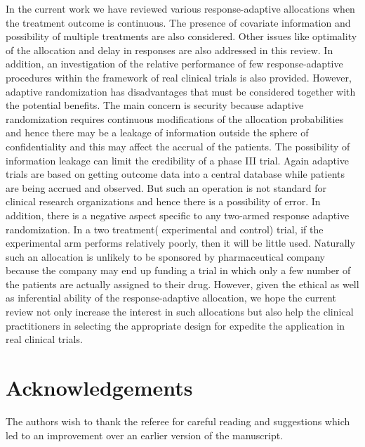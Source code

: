 In the current work we have reviewed various response-adaptive allocations when the treatment outcome is continuous. The presence of covariate information and  possibility of multiple treatments  are also considered. Other issues like optimality of the allocation and delay in responses are also addressed in this review. In addition, an investigation of the relative performance of few response-adaptive procedures within the framework of real clinical trials  is also provided. However, adaptive randomization has disadvantages that must be considered together with the potential benefits\cite{81,82}. The main  concern is security because adaptive randomization requires continuous modifications of the allocation probabilities and hence there may be a leakage of information  outside the sphere of confidentiality and this may affect the accrual of the patients.  The possibility of information leakage can limit the credibility of a phase III trial. Again adaptive trials are based on getting outcome data into a central database while patients are being accrued and observed. But such an operation is not standard for clinical research organizations  and hence there is a possibility of error. In addition, there is a negative aspect specific to any  two-armed response adaptive randomization. In a two treatment( experimental and control) trial, if the experimental arm performs relatively poorly, then it
will be little used. Naturally such an allocation is unlikely to
be sponsored by pharmaceutical company because the company may end up funding a trial in which only a few number of the patients are actually assigned to their drug.  However, given the ethical as well as inferential ability of the response-adaptive allocation, we hope the current review  not only  increase the interest in such allocations but also help the clinical practitioners in selecting the appropriate design for expedite the application in real clinical trials.\\

\section*{Acknowledgements}
The authors wish to thank the referee for careful reading and suggestions which led to an improvement over an earlier version of the manuscript.


